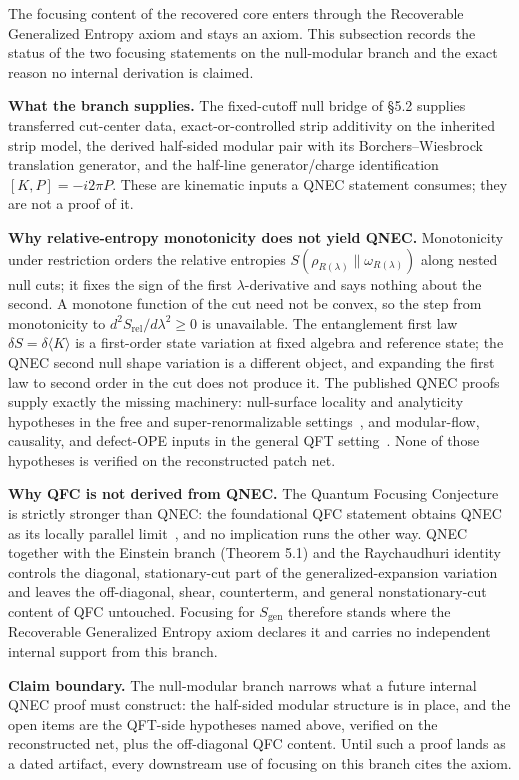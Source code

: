 The focusing content of the recovered core enters through the Recoverable Generalized Entropy axiom and stays an axiom. This subsection records the status of the two focusing statements on the null-modular branch and the exact reason no internal derivation is claimed.

\textbf{What the branch supplies.} The fixed-cutoff null bridge of \S{}5.2 supplies transferred cut-center data, exact-or-controlled strip additivity on the inherited strip model, the derived half-sided modular pair with its Borchers--Wiesbrock translation generator, and the half-line generator/charge identification \([K,P]=-i2\pi P\). These are kinematic inputs a QNEC statement consumes; they are not a proof of it.

\textbf{Why relative-entropy monotonicity does not yield QNEC.} Monotonicity under restriction orders the relative entropies \(S(\rho_{R(\lambda)}\|\omega_{R(\lambda)})\) along nested null cuts; it fixes the sign of the first \(\lambda\)-derivative and says nothing about the second. A monotone function of the cut need not be convex, so the step from monotonicity to \(d^2 S_{\mathrm{rel}}/d\lambda^2\ge0\) is unavailable. The entanglement first law \(\delta S=\delta\langle K\rangle\) is a first-order state variation at fixed algebra and reference state; the QNEC second null shape variation is a different object, and expanding the first law to second order in the cut does not produce it. The published QNEC proofs supply exactly the missing machinery: null-surface locality and analyticity hypotheses in the free and super-renormalizable settings~\cite{bousso16}, and modular-flow, causality, and defect-OPE inputs in the general QFT setting~\cite{balakrishnan19}. None of those hypotheses is verified on the reconstructed patch net.

\textbf{Why QFC is not derived from QNEC.} The Quantum Focusing Conjecture is strictly stronger than QNEC: the foundational QFC statement obtains QNEC as its locally parallel limit~\cite{bousso15qfc}, and no implication runs the other way. QNEC together with the Einstein branch (Theorem 5.1) and the Raychaudhuri identity controls the diagonal, stationary-cut part of the generalized-expansion variation and leaves the off-diagonal, shear, counterterm, and general nonstationary-cut content of QFC untouched. Focusing for \(S_{\mathrm{gen}}\) therefore stands where the Recoverable Generalized Entropy axiom declares it and carries no independent internal support from this branch.

\textbf{Claim boundary.} The null-modular branch narrows what a future internal QNEC proof must construct: the half-sided modular structure is in place, and the open items are the QFT-side hypotheses named above, verified on the reconstructed net, plus the off-diagonal QFC content. Until such a proof lands as a dated artifact, every downstream use of focusing on this branch cites the axiom.


